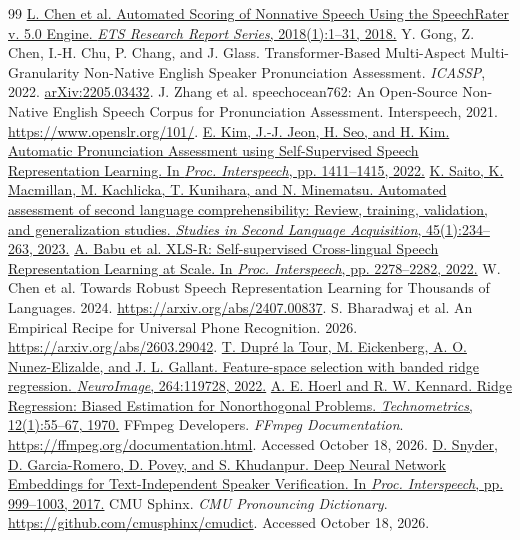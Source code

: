\documentclass[10pt]{article}
\begin{document}
\begin{thebibliography}{99}
 \href{https://doi.org/10.1002/ets2.12198}{L. Chen et al. Automated Scoring of Nonnative Speech Using the SpeechRater v. 5.0 Engine. \textit{ETS Research Report Series}, 2018(1):1--31, 2018.}
 Y. Gong, Z. Chen, I.-H. Chu, P. Chang, and J. Glass. Transformer-Based Multi-Aspect Multi-Granularity Non-Native English Speaker Pronunciation Assessment. \textit{ICASSP}, 2022. \href{https://arxiv.org/abs/2205.03432}{arXiv:2205.03432}.
 J. Zhang et al. speechocean762: An Open-Source Non-Native English Speech Corpus for Pronunciation Assessment. Interspeech, 2021. \url{https://www.openslr.org/101/}.
 \href{https://doi.org/10.21437/Interspeech.2022-10245}{E. Kim, J.-J. Jeon, H. Seo, and H. Kim. Automatic Pronunciation Assessment using Self-Supervised Speech Representation Learning. In \textit{Proc. Interspeech}, pp. 1411--1415, 2022.}
 \href{https://doi.org/10.1017/S0272263122000080}{K. Saito, K. Macmillan, M. Kachlicka, T. Kunihara, and N. Minematsu. Automated assessment of second language comprehensibility: Review, training, validation, and generalization studies. \textit{Studies in Second Language Acquisition}, 45(1):234--263, 2023.}
 \href{https://doi.org/10.21437/Interspeech.2022-143}{A. Babu et al. XLS-R: Self-supervised Cross-lingual Speech Representation Learning at Scale. In \textit{Proc. Interspeech}, pp. 2278--2282, 2022.}
 W. Chen et al. Towards Robust Speech Representation Learning for Thousands of Languages. 2024. \url{https://arxiv.org/abs/2407.00837}.
 S. Bharadwaj et al. An Empirical Recipe for Universal Phone Recognition. 2026. \url{https://arxiv.org/abs/2603.29042}.
 \href{https://doi.org/10.1016/j.neuroimage.2022.119728}{T. Dupr\'e la Tour, M. Eickenberg, A. O. Nunez-Elizalde, and J. L. Gallant. Feature-space selection with banded ridge regression. \textit{NeuroImage}, 264:119728, 2022.}
 \href{https://doi.org/10.1080/00401706.1970.10488634}{A. E. Hoerl and R. W. Kennard. Ridge Regression: Biased Estimation for Nonorthogonal Problems. \textit{Technometrics}, 12(1):55--67, 1970.}
 FFmpeg Developers. \textit{FFmpeg Documentation}. \url{https://ffmpeg.org/documentation.html}. Accessed October 18, 2026.
 \href{https://doi.org/10.21437/Interspeech.2017-620}{D. Snyder, D. Garcia-Romero, D. Povey, and S. Khudanpur. Deep Neural Network Embeddings for Text-Independent Speaker Verification. In \textit{Proc. Interspeech}, pp. 999--1003, 2017.}
 CMU Sphinx. \textit{CMU Pronouncing Dictionary}. \url{https://github.com/cmusphinx/cmudict}. Accessed October 18, 2026.

\end{thebibliography}
\end{document}
